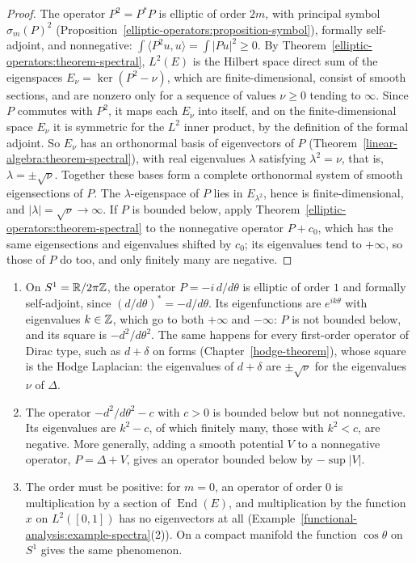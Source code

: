 \begin{proof}
The operator $P^2 = P^*P$ is elliptic of order $2m$, with principal symbol $\sigma_m(P)^2$ (Proposition~\ref{elliptic-operators:proposition-symbol}), formally self-adjoint, and nonnegative:
$\int\langle P^2u, u\rangle = \int|Pu|^2 \geq 0$. By Theorem~\ref{elliptic-operators:theorem-spectral}, $L^2(E)$ is the Hilbert space direct sum of the eigenspaces $E_\nu = \ker(P^2 - \nu)$, which are finite-dimensional,
consist of smooth sections, and are nonzero only for a sequence of values $\nu \geq 0$ tending to $\infty$. Since $P$ commutes with $P^2$, it maps each $E_\nu$ into itself, and on the finite-dimensional space $E_\nu$
it is symmetric for the $L^2$ inner product, by the definition of the formal adjoint. So $E_\nu$ has an orthonormal basis of eigenvectors of $P$ (Theorem~\ref{linear-algebra:theorem-spectral}), with real
eigenvalues $\lambda$ satisfying $\lambda^2 = \nu$, that is, $\lambda = \pm\sqrt\nu$. Together these bases form a complete orthonormal system of smooth eigensections of $P$. The $\lambda$-eigenspace of $P$ lies in
$E_{\lambda^2}$, hence is finite-dimensional, and $|\lambda| = \sqrt\nu \to \infty$. If $P$ is bounded below, apply Theorem~\ref{elliptic-operators:theorem-spectral} to the nonnegative operator $P + c_0$, which has the
same eigensections and eigenvalues shifted by $c_0$; its eigenvalues tend to $+\infty$, so those of $P$ do too, and only finitely many are negative.
\end{proof}

\begin{example}\label{elliptic-operators:example-spectral-not-positive}
\begin{enumerate}
\item On $S^1 = \mathbb{R}/2\pi\mathbb{Z}$, the operator $P = -i\,d/d\theta$ is elliptic of order $1$ and formally self-adjoint, since $(d/d\theta)^* = -d/d\theta$. Its eigenfunctions are $e^{ik\theta}$ with eigenvalues $k \in \mathbb{Z}$, which go
to both $+\infty$ and $-\infty$: $P$ is not bounded below, and its square is $-d^2/d\theta^2$. The same happens for every first-order operator of Dirac type, such as $d + \delta$ on forms
(Chapter~\ref{hodge-theorem}), whose square is the Hodge Laplacian: the eigenvalues of $d + \delta$ are $\pm\sqrt\nu$ for the eigenvalues $\nu$ of $\Delta$.
\item The operator $-d^2/d\theta^2 - c$ with $c > 0$ is bounded below but not nonnegative. Its eigenvalues are $k^2 - c$, of which finitely many, those with $k^2 < c$, are negative. More generally, adding a smooth
potential $V$ to a nonnegative operator, $P = \Delta + V$, gives an operator bounded below by $-\sup|V|$.
\item The order must be positive: for $m = 0$, an operator of order $0$ is multiplication by a section of $\operatorname{End}(E)$, and multiplication by the function $x$ on $L^2([0, 1])$ has no eigenvectors at all
(Example~\ref{functional-analysis:example-spectra}(2)). On a compact manifold the function $\cos\theta$ on $S^1$ gives the same phenomenon.
\end{enumerate}
\end{example}

